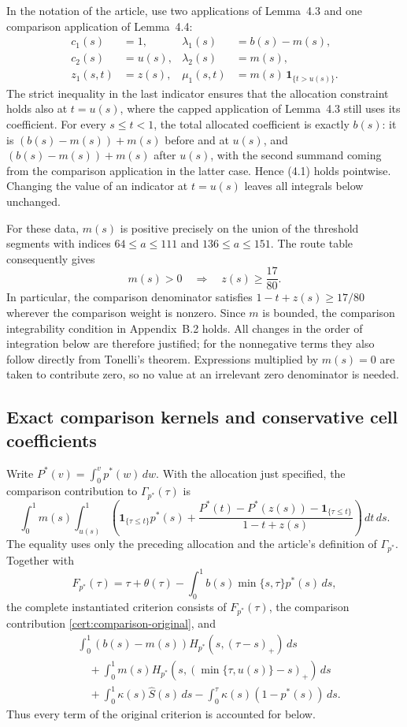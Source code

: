 \documentclass[11pt,a4paper]{article}
\begin{document}
In the notation of the article, use two applications of Lemma~4.3 and
one comparison application of Lemma~4.4:
\[
 \begin{aligned}
 c_1(s)&=1,&\lambda_1(s)&=b(s)-m(s),\\
 c_2(s)&=u(s),&\lambda_2(s)&=m(s),\\
 z_1(s,t)&=z(s),&\mu_1(s,t)&=m(s)\,\mathbf{1}_{\{t>u(s)\}}.
 \end{aligned}
\]
The strict inequality in the last indicator ensures that the allocation
constraint holds also at $t=u(s)$, where the capped application of
Lemma~4.3 still uses its coefficient.  For every $s\leq t<1$, the total
allocated coefficient is exactly $b(s)$: it is
$(b(s)-m(s))+m(s)$ before and at $u(s)$, and
$(b(s)-m(s))+m(s)$ after $u(s)$, with the second summand coming from
the comparison application in the latter case.  Hence (4.1) holds
pointwise.  Changing the value of an indicator at $t=u(s)$ leaves all
integrals below unchanged.

For these data, $m(s)$ is positive precisely on the union of the
threshold segments with indices $64\leq a\leq111$ and
$136\leq a\leq151$.  The route table consequently gives
\[
 m(s)>0\quad\Longrightarrow\quad z(s)\geq\frac{17}{80}.
\]
In particular, the comparison denominator satisfies
$1-t+z(s)\geq17/80$ wherever the comparison weight is nonzero.
Since $m$ is bounded, the comparison integrability condition in
Appendix~B.2 holds.  All changes in the order of integration below are
therefore justified; for the nonnegative terms they also follow directly
from Tonelli's theorem.  Expressions multiplied by $m(s)=0$ are taken
to contribute zero, so no value at an irrelevant zero denominator is
needed.

\subsection{Exact comparison kernels and conservative cell coefficients}
\label{cert:comparison}

Write $P^*(v)=\int_0^v p^*(w)\,dw$.  With the allocation just specified,
the comparison contribution to $\Gamma_{p^*}(\tau)$ is
\begin{equation}
 \int_0^1m(s)\int_{u(s)}^1
 \left(
   \mathbf{1}_{\{\tau\leq t\}}p^*(s)
   +\frac{P^*(t)-P^*(z(s))-\mathbf{1}_{\{\tau\leq t\}}}
          {1-t+z(s)}
 \right)\,dt\,ds.
 \label{cert:comparison-original}
\end{equation}
The equality uses only the preceding allocation and the article's
definition of $\Gamma_{p^*}$.
Together with
\[
 F_{p^*}(\tau)=\tau+\theta(\tau)
  -\int_0^1b(s)\min\{s,\tau\}p^*(s)\,ds,
\]
the complete instantiated criterion consists of $F_{p^*}(\tau)$,
the comparison contribution \eqref{cert:comparison-original}, and
\begin{align*}
 &\int_0^1(b(s)-m(s))H_{p^*}(s,(\tau-s)_+)\,ds\\
 &\quad+\int_0^1m(s)H_{p^*}(s,(\min\{\tau,u(s)\}-s)_+)\,ds\\
 &\quad+\int_0^1\kappa(s)\widehat S(s)\,ds
          -\int_0^\tau\kappa(s)(1-p^*(s))\,ds.
\end{align*}
Thus every term of the original criterion is accounted for below.
\end{document}
